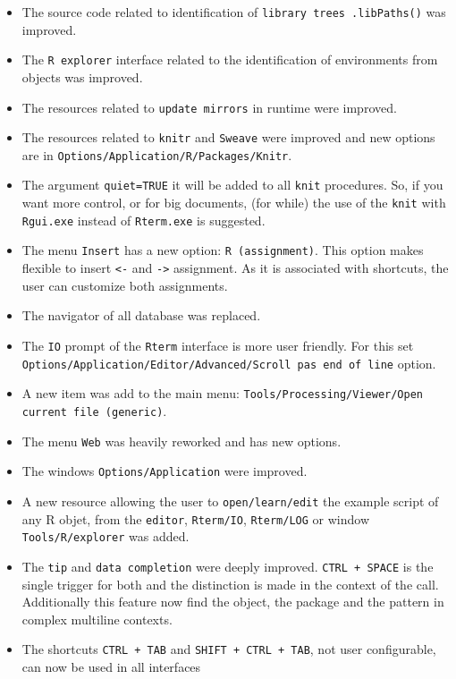 \begin{itemize}
  \item The source code related to identification of \texttt{library trees .libPaths()} was improved.
  \item The \texttt{R explorer} interface related to the identification of environments from objects was improved.
  \item The resources related to \texttt{update mirrors} in runtime were improved.
  \item The resources related to \texttt{knitr} and \texttt{Sweave} were improved and new options are in \texttt{Options/Application/R/Packages/Knitr}.
  \item The argument \texttt{quiet=TRUE} it will be added to all \texttt{knit} procedures.
    So, if you want more control, or for big documents, (for while) the use of the \texttt{knit}
    with \texttt{Rgui.exe} instead of \texttt{Rterm.exe} is suggested.
  \item The menu \texttt{Insert} has a new option: \texttt{R (assignment)}. This option makes flexible
    to insert \texttt{<-} and \texttt{->} assignment. As it is associated with shortcuts, the user can customize both assignments.
  \item The navigator of all database was replaced.
  \item The \texttt{IO} prompt of the \texttt{Rterm} interface is more user friendly. For this
    set \texttt{Options/Application/Editor/Advanced/Scroll pas end of line} option.
  \item A new item was add to the main menu: \texttt{Tools/Processing/Viewer/Open current file (generic)}.
  \item The menu \texttt{Web} was heavily reworked and has new options.
  \item The windows \texttt{Options/Application} were improved.
  \item A new resource allowing the user to \texttt{open/learn/edit} the example script of any R objet,
    from the \texttt{editor}, \texttt{Rterm/IO}, \texttt{Rterm/LOG} or window \texttt{Tools/R/explorer} was added.
  \item The \texttt{tip} and \texttt{data completion} were deeply improved.
    \texttt{CTRL + SPACE} is the single trigger for both and the distinction is made in the context of the call.
    Additionally this feature now find the object, the package and the pattern in complex multiline contexts.
  \item The shortcuts \texttt{CTRL + TAB} and \texttt{SHIFT + CTRL + TAB}, not user configurable, can now be used in all interfaces

\end{itemize}
